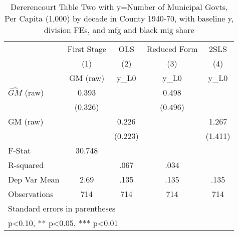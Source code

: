 \begin{table}[htbp]\centering
\def\sym#1{\ifmmode^{#1}\else\(^{#1}\)\fi}
\caption{Dererencourt Table Two with y=Number of Municipal Govts, Per Capita (1,000) by decade in County 1940-70, with baseline y, division FEs, and mfg and black mig share}
\begin{tabular}{l*{4}{c}}
\toprule
                    & First Stage   &         OLS   &Reduced Form   &        2SLS   \\
                    &\multicolumn{1}{c}{(1)}&\multicolumn{1}{c}{(2)}&\multicolumn{1}{c}{(3)}&\multicolumn{1}{c}{(4)}\\
                    &\multicolumn{1}{c}{GM  (raw)}&\multicolumn{1}{c}{y\_L0}&\multicolumn{1}{c}{y\_L0}&\multicolumn{1}{c}{y\_L0}\\
\midrule
$\hat{GM}$ (raw)    &       0.393   &               &       0.498   &               \\
                    &     (0.326)   &               &     (0.496)   &               \\
\addlinespace
GM  (raw)           &               &       0.226   &               &       1.267   \\
                    &               &     (0.223)   &               &     (1.411)   \\
\midrule
F-Stat              &      30.748   &               &               &               \\
R-squared           &               &        .067   &        .034   &               \\
Dep Var Mean        &        2.69   &        .135   &        .135   &        .135   \\
Observations        &         714   &         714   &         714   &         714   \\
\bottomrule
\multicolumn{5}{l}{\footnotesize Standard errors in parentheses}\\
\multicolumn{5}{l}{\footnotesize * p<0.10, ** p<0.05, *** p<0.01}\\
\end{tabular}
\end{table}
